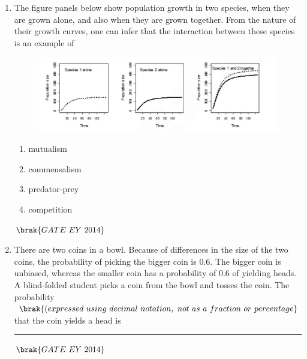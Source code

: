 \documentclass[journal]{IEEEtran}
\numberwithin{equation}{enumi}
\numberwithin{figure}{enumi}
\begin{document}
\begin{enumerate}
    \item The figure panels below show population growth in two species, when they are grown alone, and also when they are grown together. From the nature of their growth curves, one can infer that the interaction between these species is an example of
    \begin{figure}[H]
    \centering
    \includegraphics[width=0.8\columnwidth]{figs/11.png}
    \caption{}
    \label{fig:11}
   \end{figure}
    \begin{multicols}{2}
    \begin{enumerate}
        \item mutualism
        \item commensalism
        \item predator-prey
        \item competition
    \end{enumerate}
    \end{multicols}
    \hfill{$\brak{ GATE\ EY\ 2014}$}
    \bigskip

    \item There are two coins in a bowl. Because of differences in the size of the two coins, the probability of picking the bigger coin is $0.6$. The bigger coin is unbiased, whereas the smaller coin has a probability of $0.6$ of yielding heads. A blind-folded student picks a coin from the bowl and tosses the coin. The probability$\brak{(expressed\ using\ decimal\ notation,\ not\ as\ a\ fraction\ or\ percentage}$ that the coin yields a head is \rule{3cm}{0.15mm}
    \hfill{$\brak{ GATE\ EY\ 2014}$}
    \bigskip
    

\end{enumerate}
\end{document}
